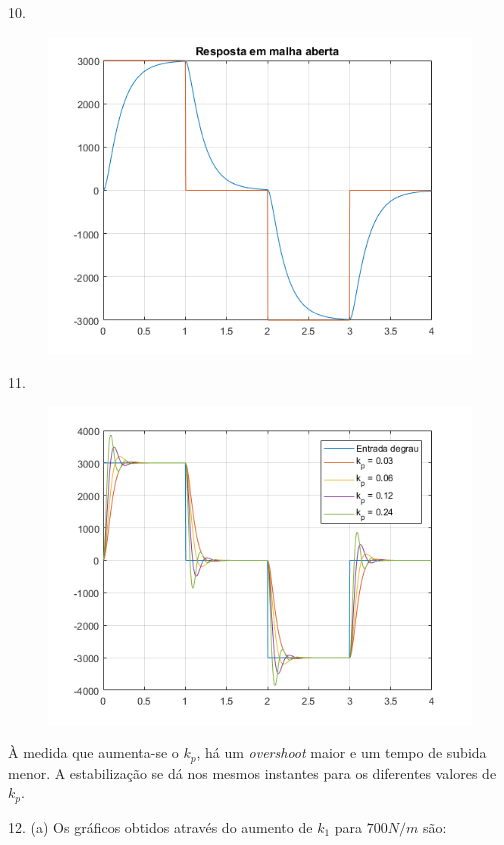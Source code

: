 \documentclass[a4paper,11pt]{article}
\begin{document}
10.
\begin{figure}[H]
\includegraphics{exp01e10}
\centering
\end{figure}

11.
\begin{figure}[H]
\includegraphics{exp01e11}
\centering
\end{figure}

À medida que aumenta-se o $k_p$, há um \textit{overshoot} maior e um tempo de
subida menor. A estabilização se dá nos mesmos instantes para os diferentes
valores de $k_p$.

12. (a) Os gráficos obtidos através do aumento de $k_1$ para $700 N/m$ são:
\end{document}
